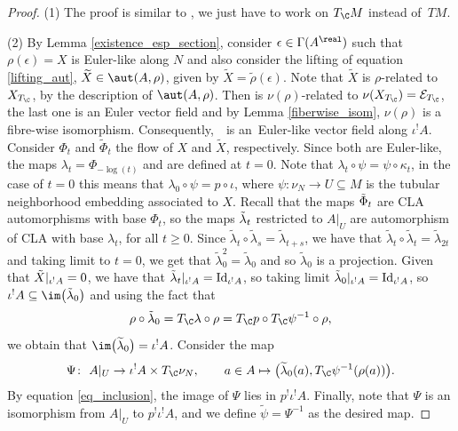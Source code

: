 \begin{proof}
(1) The proof is similar to \cite[Theorem 3.13]{bursztyn2019splitting}, we just have to work on $T_{\C}M$ instead of~$TM$.

   (2) By Lemma \ref{existence_esp_section}, consider $\epsilon\in \Gamma(A^{\real})$ such that $\rho(\epsilon)=X$ is Euler-like along $N$ and also consider the lifting of equation \eqref{lifting_aut}, $\widetilde{X}\in \aut(A, \rho)$, given by $\widetilde{X}=\widetilde{\rho}(\epsilon)$.
  Note that $\widetilde{X}$ is $\rho$-related to $X_{T_{\C}}$, by the description of $\aut(A,\rho)$.
   Then  is $\nu(\rho)$-related to $\nu(X_{T_{\C}})=\mathcal{E}_{T_{\C}}$, the last one is an Euler vector field and by Lemma \ref{fiberwise_isom}, $\nu(\rho)$ is a fibre-wise isomorphism. Consequently,~~is an~Euler-like vector field along $\iota^! A$.
   Consider $\Phi_t$ and $\widetilde{\Phi}_t$ the flow of $X$ and $\widetilde{X}$, respectively. Since both are Euler-like, the maps $\lambda_t=\Phi_{-\log(t)}$ and  are defined at $t=0$. Note that $ \lambda_t\circ \psi=\psi\circ \kappa_t$, in the case of $t=0$ this means that $\lambda_0\circ\psi=p\circ \iota$, where $\psi\colon \nu_N\to U\subseteq M$ is the tubular neighborhood embedding associated to $X$. Recall that the maps $\Tilde{\Phi}_t$ are CLA automorphisms with base $\Phi_t$, so the maps $\Tilde{\lambda}_t$ restricted to $A|_U$ are automorphism of CLA with base $\lambda_t$, for all $t\geq 0$.
   Since $\widetilde{\lambda}_t\circ\widetilde{\lambda}_s=\widetilde{\lambda}_{t+s}$, we have that $\widetilde{\lambda}_t\circ\widetilde{\lambda}_t=\widetilde{\lambda}_{2t}$ and taking limit to $t=0$, we get that $\widetilde{\lambda}^2_0=\widetilde{\lambda}_0$ and so $\widetilde{\lambda}_0$ is a projection. Given that $\Tilde{X}|_{\iota^! A}=0$, we have that $\Tilde{\lambda}_t|_{\iota^! A}={\rm Id}_{\iota^! A}$, so taking limit $\Tilde{\lambda}_0|_{\iota^! A}={\rm Id}_{\iota^! A}$, so $\iota^! A\subseteq \im\bigl(\Tilde{\lambda}_0\bigr)$ and using the fact that
  \begin{equation}\label{eq_inclusion}
    \rho\circ \Tilde{\lambda}_0=T_{\C}\lambda\circ \rho=T_{\C}p\circ T_{\C}\psi^{-1}\circ\rho,
  \end{equation}
  we obtain that $\im\bigl(\widetilde{\lambda}_0\bigr)=\iota^! A$. Consider the map
  \begin{align*} \Psi\colon \ A|_U \to \iota^! A\times T_{\C}\nu_N, \qquad
   a\in A \mapsto \bigl(\widetilde{\lambda}_0(a), T_{\C}\psi^{-1}(\rho(a))\bigr).
   \end{align*}
By equation \eqref{eq_inclusion}, the image of $\Psi$ lies in $p^!\iota^! A$. Finally, note that $\Psi$ is an isomorphism from $A|_U$ to $p^!\iota^! A$, and we define $\widetilde{\psi}=\Psi^{-1}$ as the desired map.
\end{proof}


